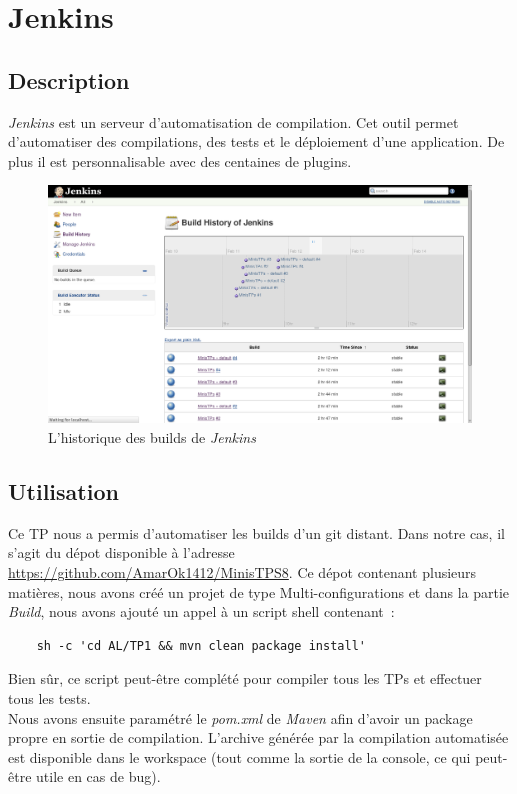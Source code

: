 \documentclass{article}
\begin{document}
\section{Jenkins}
\subsection{Description}
\emph{Jenkins} est un serveur d'automatisation de compilation. Cet outil permet d'automatiser des compilations, des tests et le déploiement d'une application. De plus il est personnalisable avec des centaines de plugins.
\begin{figure}
	\begin{center}
		\includegraphics[scale=0.3]{img/jenkins}
		\caption{L'historique des builds de \emph{Jenkins}}
		\label{fig:Jenkins}
	\end{center}
\end{figure}
\subsection{Utilisation}
Ce TP nous a permis d'automatiser les builds d'un git distant. Dans notre cas, il s'agit du dépot disponible à l'adresse \url{https://github.com/AmarOk1412/MinisTPS8}. Ce dépot contenant plusieurs matières, nous avons créé un projet de type Multi-configurations et dans la partie \emph{Build}, nous avons ajouté un appel à un script shell contenant~:
\begin{verbatim}
	sh -c 'cd AL/TP1 && mvn clean package install'
\end{verbatim}
Bien sûr, ce script peut-être complété pour compiler tous les TPs et effectuer tous les tests.\\
Nous avons ensuite paramétré le \emph{pom.xml} de \emph{Maven} afin d'avoir un package propre en sortie de compilation. L'archive générée par la compilation automatisée est disponible dans le workspace (tout comme la sortie de la console, ce qui peut-être utile en cas de bug).
\end{document}

